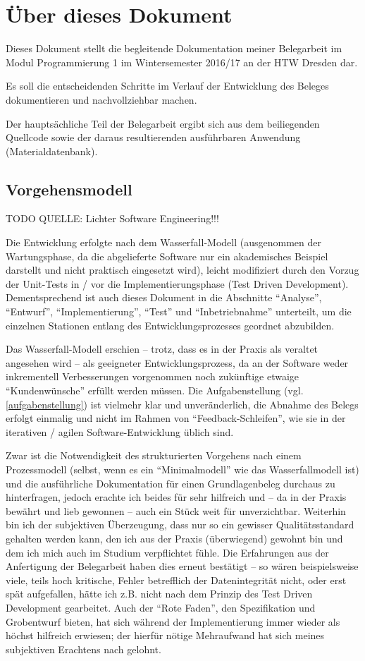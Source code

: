 \section{Über dieses Dokument}

Dieses Dokument stellt die begleitende Dokumentation meiner Belegarbeit im Modul Programmierung 1
im Wintersemester 2016/17 an der HTW Dresden dar.

Es soll die entscheidenden Schritte im Verlauf der Entwicklung des Beleges dokumentieren und
nachvollziehbar machen.

Der hauptsächliche Teil der Belegarbeit ergibt sich aus dem beiliegenden Quellcode sowie der daraus resultierenden
ausführbaren Anwendung (Materialdatenbank).

\subsection{Vorgehensmodell}
TODO QUELLE: Lichter Software Engineering!!!

Die Entwicklung erfolgte nach dem Wasserfall-Modell (ausgenommen der Wartungsphase, da die abgelieferte Software
nur ein akademisches Beispiel darstellt und nicht praktisch eingesetzt wird), leicht modifiziert durch den Vorzug der
Unit-Tests in / vor die Implementierungsphase (Test Driven Development). Dementsprechend ist auch dieses Dokument
in die Abschnitte ``Analyse'', ``Entwurf'', ``Implementierung'', ``Test'' und ``Inbetriebnahme''
unterteilt, um die einzelnen Stationen entlang des Entwicklungsprozesses geordnet abzubilden.

Das Wasserfall-Modell erschien -- trotz, dass es in der Praxis als veraltet angesehen wird -- als geeigneter
Entwicklungsprozess, da an der Software weder inkrementell Verbesserungen vorgenommen noch zukünftige etwaige
``Kundenwünsche'' erfüllt werden müssen. Die Aufgabenstellung (vgl. \ref{aufgabenstellung}) ist vielmehr klar und
unveränderlich, die Abnahme des Belegs erfolgt einmalig und nicht im Rahmen von ``Feedback-Schleifen'', wie sie in
der iterativen / agilen Software-Entwicklung üblich sind.

Zwar ist die Notwendigkeit des strukturierten Vorgehens nach einem Prozessmodell (selbst, wenn es ein ``Minimalmodell''
wie das Wasserfallmodell ist) und die ausführliche Dokumentation für einen Grundlagenbeleg durchaus zu hinterfragen,
jedoch erachte ich beides für sehr hilfreich und -- da in der Praxis bewährt und lieb gewonnen -- auch ein Stück weit für
unverzichtbar. Weiterhin bin ich der subjektiven Überzeugung, dass nur so ein gewisser Qualitätsstandard gehalten werden
kann, den ich aus der Praxis (überwiegend) gewohnt bin und dem ich mich auch im Studium verpflichtet fühle.
Die Erfahrungen aus der Anfertigung der Belegarbeit haben dies erneut bestätigt -- so wären beispielsweise viele, teils
hoch kritische, Fehler betrefflich der Datenintegrität nicht, oder erst spät aufgefallen, hätte ich z.B. nicht nach dem
Prinzip des Test Driven Development gearbeitet. Auch der ``Rote Faden'', den Spezifikation und Grobentwurf bieten,
hat sich während der Implementierung immer wieder als höchst hilfreich erwiesen; der hierfür nötige Mehraufwand hat sich
meines subjektiven Erachtens nach gelohnt.
